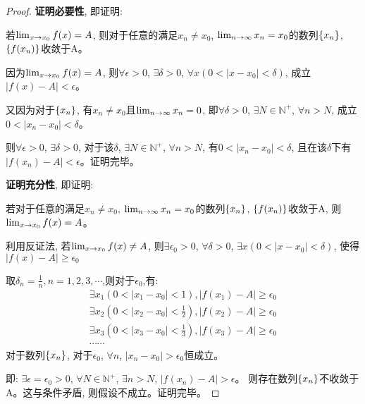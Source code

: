 \documentclass[lang=cn]{elegantbook}
\begin{document}
\begin{proof}
    {\bf 证明必要性}, 即证明: 
    
    若$\lim_{x \to x_0 } f(x) = A$, 则对于任意的满足$x_n \neq x_0$, $\lim_{n \to \infty } x_n = x_0$的数列$\left\{ x_n\right\}$, $\left\{ f(x_n)\right\}$收敛于A。

    因为$\lim_{x \to x_0 } f(x) = A$, 则$\forall \epsilon > 0$, $\exists \delta > 0$, $\forall x ( 0 < \left| x - x_0 \right| < \delta)$, 成立$\left| f(x) - A \right| < \epsilon$。

    又因为对于$\left\{ x_n\right\}$, 有$x_n \neq x_0$且$\lim_{n \to \infty } x_n = 0$, 即$\forall \delta > 0$, $\exists N \in \mathbb{N}^+$, $\forall n > N$, 成立$0 < \left| x_n - x_0 \right| < \delta$。

    则$\forall \epsilon > 0$, $\exists \delta > 0$, 对于该$\delta$, $\exists N \in \mathbb{N}^+$, $\forall n > N$, 有$0 < \left| x_n - x_0 \right| < \delta$, 且在该$\delta$下有$\left| f(x_n) - A \right| < \epsilon$。证明完毕。

    {\bf 证明充分性}, 即证明:
    
    若对于任意的满足$x_n \neq x_0$, $\lim_{n \to \infty } x_n = x_0$的数列$\left\{ x_n\right\}$, $\left\{ f(x_n)\right\}$收敛于A, 则$\lim_{x \to x_0 } f(x) = A$。

    利用反证法, 若$\lim_{x \to x_0 } f(x) \neq A$, 则$\exists \epsilon_0 > 0$, $\forall \delta > 0$, $\exists x ( 0 < \left| x - x_0 \right| < \delta)$, 使得$\left| f(x) - A \right| \ge \epsilon_0$

    取$\delta_n = \frac{1}{n}, n = 1, 2, 3, \cdots$,则对于$\epsilon_0$,有:
    \begin{gather*}
        \exists x_1(0 < \left| x_1 -x_0 \right| < 1), \left| f(x_1) - A \right| \ge \epsilon_0 \\
        \exists x_2(0 < \left| x_2 -x_0 \right| < \frac{1}{2}), \left| f(x_2) - A \right| \ge \epsilon_0 \\
        \exists x_3(0 < \left| x_3 -x_0 \right| < \frac{1}{3}), \left| f(x_3) - A \right| \ge \epsilon_0 \\
        \cdots \cdots
    \end{gather*}
    对于数列$\left\{ x_n\right\}$, 对于$\epsilon_0$, $\forall n$, $\left| x_n - x_0\right| > \epsilon_0$恒成立。

    即: $\exists \epsilon = \epsilon_0 > 0$, $\forall N \in \mathbb{N}^+$, $\exists n > N$, $\left| f(x_n) - A\right| > \epsilon$。
    则存在数列$\left\{ x_n\right\}$不收敛于A。这与条件矛盾, 则假设不成立。证明完毕。

\end{proof}
\end{document}
